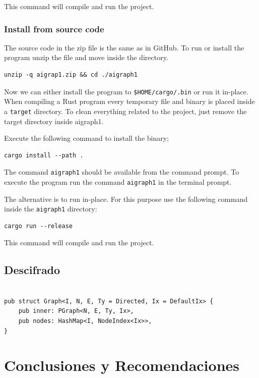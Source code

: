 This command will compile and run the project.

\subsubsection{Install from source code}

The source code in the zip file is the same as in GitHub. To run or install the program unzip the file and move inside the
directory.


\begin{verbatim}
unzip -q aigrap1.zip && cd ./aigraph1
\end{verbatim}


Now we can either install the program to \texttt{\$HOME/cargo/.bin} or run it in-place. When compiling a 
Rust program every temporary file and binary is placed inside a \texttt{target} directory. To clean everything
related to the project, just remove the target directory inside aigraph1.

Execute the following command to install the binary;

\begin{verbatim}
cargo install --path .
\end{verbatim}

The command \texttt{aigraph1} should be available from the command prompt.
To execute the program run the command \texttt{aigraph1} in the terminal prompt.

The alternative is to run in-place. For this purpose use the following command inside the \texttt{aigraph1} directory:

\begin{verbatim}
cargo run --release
\end{verbatim}

This command will compile and run the project.


\newpage

\subsection{Descifrado}
\begin{verbatim}

pub struct Graph<I, N, E, Ty = Directed, Ix = DefaultIx> {
    pub inner: PGraph<N, E, Ty, Ix>,
    pub nodes: HashMap<I, NodeIndex<Ix>>,
}
\end{verbatim}

\newpage
\section{Conclusiones y Recomendaciones}



